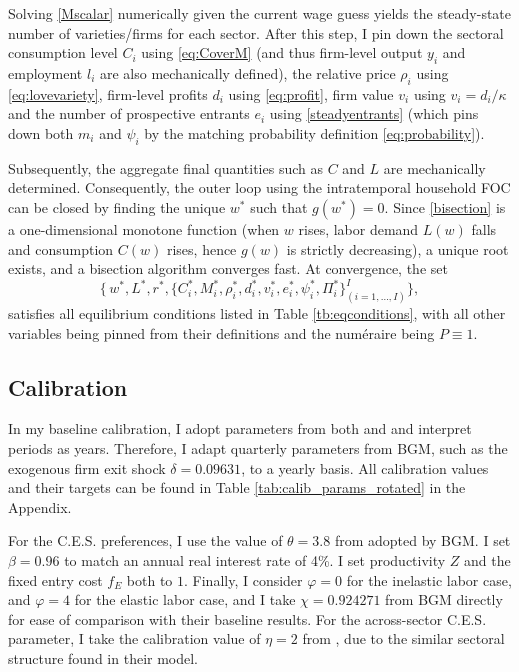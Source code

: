 \documentclass[a4paper,12pt]{article} %
\numberwithin{equation}{section} %
\numberwithin{figure}{section}
\numberwithin{table}{section}
\begin{document}
Solving \eqref{Mscalar} numerically given the current wage guess yields the
steady-state number of varieties/firms for each sector. After this step, I pin down the sectoral consumption level $C_i$ using 
\eqref{eq:CoverM} (and thus firm-level output $y_i$ and employment $l_i$ are also mechanically defined), the relative 
price $\rho_i$ using \eqref{eq:lovevariety}, firm-level profits $d_i$ using \eqref{eq:profit}, firm value $v_i$ using 
$v_i = d_i/\kappa$ and the number of prospective entrants $e_i$ using \eqref{steadyentrants} (which pins down both $m_i$
and $\psi_i$ by the matching probability definition \eqref{eq:probability}).

Subsequently, the aggregate final quantities such as $C$ and $L$ are mechanically determined. Consequently, the outer loop
using the intratemporal household FOC can be closed by finding the unique $w^*$ such that $g(w^*)= 0$. Since \eqref{bisection} is a 
one-dimensional monotone function (when $w$ rises, labor demand $L(w)$ falls and consumption $C(w)$ rises, 
hence $g(w)$ is strictly decreasing), a unique root exists, and a bisection algorithm converges fast. At convergence, the set
\[
\bigl\{\,w^*,L^*,r^*,\bigl\{
        C_i^*,M_i^*,\rho_i^*,d_i^*,v_i^*,e_i^*, \psi_i^*,\Pi_i^*\bigr\}^I_{(i=1,\dots,I)}\bigr\},
\]
satisfies all equilibrium conditions listed in Table \ref{tb:eqconditions}, with all other variables being 
pinned from their definitions and the numéraire being $P \equiv 1$.

\subsection{Calibration}
\label{sec:quant-cal} 

In my baseline calibration, I adopt parameters from both \textcite{bilbiie2012endogenous} and \textcite{sedlavcek2017growth} and
interpret periods as years. Therefore, I adapt quarterly parameters from BGM, such as the exogenous firm exit shock $\delta = 0.09631$, 
to a yearly basis. All calibration values and their targets can be found in Table \ref{tab:calib_params_rotated} in the Appendix.

For the C.E.S. preferences, I use the value of $\theta = 3.8$ from \textcite{bernard2003plants} 
adopted by BGM. I set $\beta = 0.96$ to match an annual real interest rate of 4\%. I set productivity $Z$ and 
the fixed entry cost $f_E$ both to $1$. Finally, I consider $\varphi = 0$ for the inelastic labor case, 
and $\varphi = 4$ for the elastic labor case, and I take $\chi = 0.924271$ from BGM directly for ease of comparison
with their baseline results. For the across-sector C.E.S. parameter, I take the calibration value of $\eta = 2$ from
\textcite{carvalho2021sectoral}, due to the similar sectoral structure found in their model.
\end{document}
